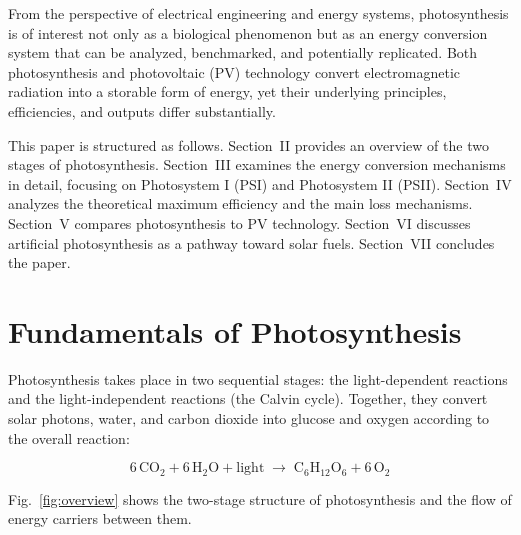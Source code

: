 \documentclass[conference]{IEEEtran}
\begin{document}
From the perspective of electrical engineering and energy systems, photosynthesis is of interest not only as a biological phenomenon but as an energy conversion system that can be analyzed, benchmarked, and potentially replicated. Both photosynthesis and photovoltaic (PV) technology convert electromagnetic radiation into a storable form of energy, yet their underlying principles, efficiencies, and outputs differ substantially.

This paper is structured as follows. Section~II provides an overview of the two stages of photosynthesis. Section~III examines the energy conversion mechanisms in detail, focusing on Photosystem I (PSI) and Photosystem II (PSII). Section~IV analyzes the theoretical maximum efficiency and the main loss mechanisms. Section~V compares photosynthesis to PV technology. Section~VI discusses artificial photosynthesis as a pathway toward solar fuels. Section~VII concludes the paper.

\section{Fundamentals of Photosynthesis}

Photosynthesis takes place in two sequential stages: the light-dependent reactions and the light-independent reactions (the Calvin cycle). Together, they convert solar photons, water, and carbon dioxide into glucose and oxygen according to the overall reaction:

\begin{equation}
6\,\text{CO}_2 + 6\,\text{H}_2\text{O} + \text{light} \;\longrightarrow\; \text{C}_6\text{H}_{12}\text{O}_6 + 6\,\text{O}_2
\end{equation}

Fig.~\ref{fig:overview} shows the two-stage structure of photosynthesis and the flow of energy carriers between them.
\end{document}
